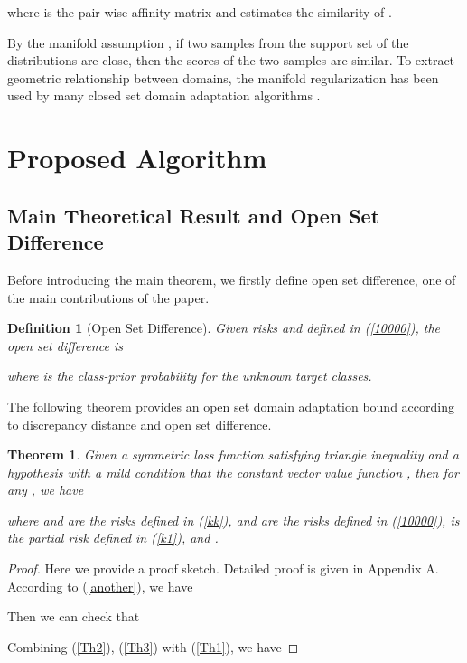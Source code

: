 \documentclass[journal]{IEEEtran}
\newtheorem{theorem}{\textbf{Theorem}}
\newtheorem{Definition}{Definition}
\begin{document}
{where  is the pair-wise affinity matrix and  estimates the similarity of .}

{By  the  manifold  assumption} \cite{DBLP:journals/jmlr/BelkinNS06}, {if two samples from the support set of the distributions  are  close, then  the  scores  of  the  two samples are similar. To extract geometric relationship between domains, the manifold regularization has been used by many closed set domain adaptation algorithms} \cite{ DBLP:conf/cikm/QuanzH09,DBLP:journals/tkde/LongWDPY14,DBLP:conf/mm/WangFCYHY18,DBLP:journals/tkde/Long0DS014,DBLP:journals/kbs/ZhangLO19,DBLP:journals/pami/LiZ19,DBLP:conf/ijcai/WangM11}.

\section{Proposed Algorithm}
\subsection{Main Theoretical Result and Open Set Difference}
Before introducing the main theorem, we firstly define open set difference, one of the main contributions of the paper. 
\begin{Definition}[{Open Set Difference}]\label{OSD} Given risks  and  defined in (\ref{10000}), the open set difference is

where  is the  class-prior probability for the unknown target classes.
\end{Definition}
The following
theorem provides an open set domain adaptation bound according to discrepancy distance and open set difference.
\begin{theorem}\label{-1000}
Given a symmetric loss function  satisfying triangle inequality and  a hypothesis  with a mild condition that the constant vector value function , 
then for any ,  we have 

 where  and  are the risks defined in (\ref{kk}),  and  are the risks defined in (\ref{10000}),  is the partial risk defined in (\ref{k1}), and .
\end{theorem}
\begin{proof}
{Here we provide a proof sketch. Detailed proof is given in Appendix A.} {According to} (\ref{another}), {we have}

{Then we can check that }

 


 
{Combining}  (\ref{Th2}),  (\ref{Th3}) {with} (\ref{Th1}), {we have}
 
\end{proof}
{{}}
\end{document}
